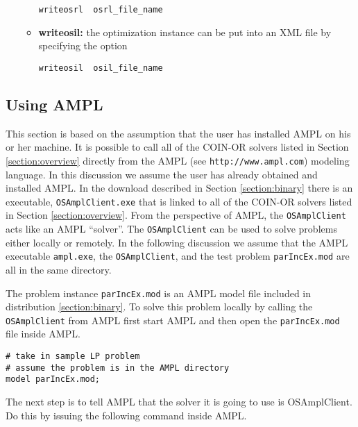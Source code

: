 \documentclass[11pt]{article}
\renewcommand{\{}{{\char"7B}}
\renewcommand{\}}{{\char"7D}}
\renewcommand{\^}{{\char"0D}}
\renewcommand{\'}{{\char"0D}}
\begin{document}
\begin{enumerate}
\begin{itemize}
\begin{verbatim}
writeosrl  osrl_file_name
\end{verbatim}



\item    {\bf writeosil:}   the optimization instance  can be put into an XML file by specifying the option

\begin{verbatim}
writeosil  osil_file_name
\end{verbatim}
\end{itemize}



\end{enumerate}

\subsection{Using AMPL}\label{section:ampl}

This section is based on the assumption that the user has installed  AMPL  on his or her machine.   It is possible to call all of the COIN-OR solvers listed in Section \ref{section:overview} directly from the  AMPL 
(see {\tt http://www.ampl.com}) modeling language.  In this discussion we assume the user has already obtained and 
installed AMPL.  In  the download described in Section \ref{section:binary} there is an executable, {\tt OSAmplClient.exe}  that is linked to all of the COIN-OR solvers  listed in Section \ref{section:overview}.   From the  perspective of AMPL, the   {\tt OSAmplClient} acts 
like an AMPL ``solver''.    The {\tt OSAmplClient}   can be used 
to solve problems either locally or remotely.   
In the following discussion we assume that the AMPL executable {\tt ampl.exe}, the {\tt OSAmplClient},  and the test problem {\tt  parIncEx.mod} are all in the same directory.  


The  problem instance {\tt parIncEx.mod} is an AMPL model file included in distribution  \ref{section:binary}.  To solve this problem locally by calling the {\tt OSAmplClient} from AMPL first start AMPL and then open the {\tt parIncEx.mod} file inside AMPL.

\begin{verbatim}
# take in sample LP problem
# assume the problem is in the AMPL directory
model parIncEx.mod;
\end{verbatim}

The next step is to tell AMPL that the solver it is going to use is OSAmplClient. Do this by issuing the following command inside AMPL.
\end{document}
